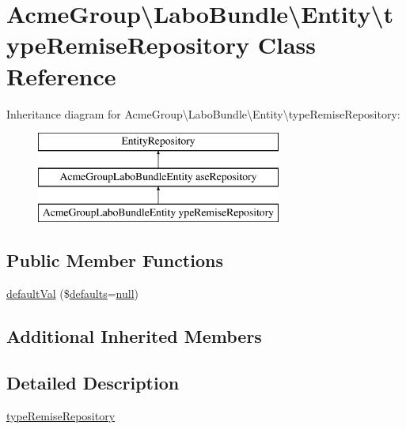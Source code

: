 \hypertarget{class_acme_group_1_1_labo_bundle_1_1_entity_1_1type_remise_repository}{\section{Acme\+Group\textbackslash{}Labo\+Bundle\textbackslash{}Entity\textbackslash{}type\+Remise\+Repository Class Reference}
\label{class_acme_group_1_1_labo_bundle_1_1_entity_1_1type_remise_repository}
}
Inheritance diagram for Acme\+Group\textbackslash{}Labo\+Bundle\textbackslash{}Entity\textbackslash{}type\+Remise\+Repository\+:\begin{figure}[H]
\begin{center}
\leavevmode
\includegraphics[height=3.000000cm]{class_acme_group_1_1_labo_bundle_1_1_entity_1_1type_remise_repository}
\end{center}
\end{figure}
\subsection*{Public Member Functions}
\begin{DoxyCompactItemize}
\item 
\hyperlink{class_acme_group_1_1_labo_bundle_1_1_entity_1_1type_remise_repository_a86c1e9781e00ab12cd6978bea70ffc1d}{default\+Val} (\$\hyperlink{model_8defaults_8js_a9114d742403a54e409eca2e2c78bff56}{defaults}=\hyperlink{validate_8js_afb8e110345c45e74478894341ab6b28e}{null})
\end{DoxyCompactItemize}
\subsection*{Additional Inherited Members}


\subsection{Detailed Description}
\hyperlink{class_acme_group_1_1_labo_bundle_1_1_entity_1_1type_remise_repository}{type\+Remise\+Repository}

